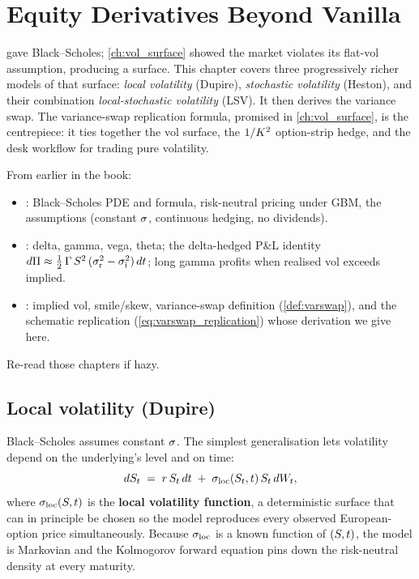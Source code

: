 \chapter{Equity Derivatives Beyond Vanilla}
\label{ch:equity_derivatives}

 gave Black--Scholes; \cref{ch:vol_surface} showed
the market violates its flat-vol assumption, producing a surface. This
chapter covers three progressively richer models of that surface:
\emph{local volatility} (Dupire), \emph{stochastic volatility} (Heston),
and their combination \emph{local-stochastic volatility} (LSV). It then
derives the variance swap. The variance-swap replication formula,
promised in \cref{ch:vol_surface}, is the centrepiece: it ties together
the vol surface, the $1/K^2$ option-strip hedge, and the desk
workflow for trading pure volatility.

\begin{backgroundbox}[Prerequisites]
From earlier in the book:
\begin{itemize}
  \item {}: Black--Scholes PDE and formula,
    risk-neutral pricing under GBM, the assumptions (constant
    $\sigma$, continuous hedging, no dividends).
  \item {}: delta, gamma, vega, theta; the
    delta-hedged P\&L identity $d\Pi \approx \tfrac12\,\Gamma\,S^2\,
    (\sigma_{\text{r}}^2 - \sigma_{\text{i}}^2)\,dt$; long gamma
    profits when realised vol exceeds implied.
  \item {}: implied vol, smile/skew, variance-swap
    definition (\cref{def:varswap}), and the schematic replication
    (\cref{eq:varswap_replication}) whose derivation we give here.
\end{itemize}
Re-read those chapters if hazy.
\end{backgroundbox}


\section{Local volatility (Dupire)}
\label{sec:local_vol}

Black--Scholes assumes constant $\sigma$. The simplest generalisation
lets volatility depend on the underlying's level and on time:
\begin{equation}
  dS_t \;=\; r\,S_t\,dt
              \;+\; \sigma_{\text{loc}}(S_t, t)\,S_t\,dW_t,
  \label{eq:local_vol_sde}
\end{equation}
where $\sigma_{\text{loc}}(S, t)$ is the \textbf{local volatility
function}, a deterministic surface that can in principle be chosen
so the model reproduces every observed European-option price
simultaneously. Because $\sigma_{\text{loc}}$ is a known function of
$(S, t)$, the model is Markovian and the Kolmogorov forward
equation pins down the risk-neutral density at every maturity.

